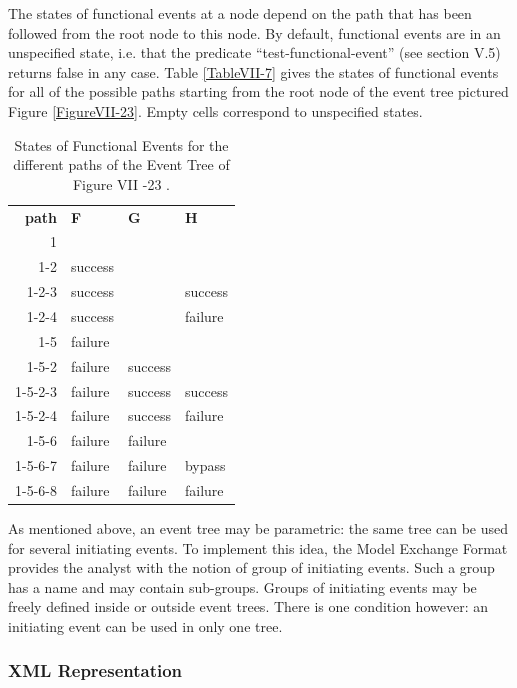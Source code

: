 \documentclass[11pt]{article}
\begin{document}
The states of functional events at a node depend on the path that has
been followed from the root node to this node. By default, functional
events are in an unspecified state, i.e. that the predicate
``test-functional-event'' (see section V.5) returns false in any case.
Table \ref{TableVII-7} gives the states of functional events for all of the
possible paths starting from the root node of the event tree pictured
Figure \ref{FigureVII-23}. Empty cells correspond to unspecified states.



\begin{table}[htbp]
\caption{States of Functional Events for the different paths of the Event Tree of Figure VII -23 \label{TableVI-I7}.}
\centering
\begin{tabular}{rlll}
\textbf{path} & \textbf{F} & \textbf{G} & \textbf{H}\\
1 &  &  & \\
1-2 & success &  & \\
1-2-3 & success &  & success\\
1-2-4 & success &  & failure\\
1-5 & failure &  & \\
1-5-2 & failure & success & \\
1-5-2-3 & failure & success & success\\
1-5-2-4 & failure & success & failure\\
1-5-6 & failure & failure & \\
1-5-6-7 & failure & failure & bypass\\
1-5-6-8 & failure & failure & failure\\
\end{tabular}
\end{table}



As mentioned above, an event tree may be parametric: the same tree can
be used for several initiating events. To implement this idea, the Model
Exchange Format provides the analyst with the notion of group of
initiating events. Such a group has a name and may contain sub-groups.
Groups of initiating events may be freely defined inside or outside
event trees. There is one condition however: an initiating event can be
used in only one tree.

\subsubsection{XML Representation}
\label{sec:org241e535}
\end{document}
